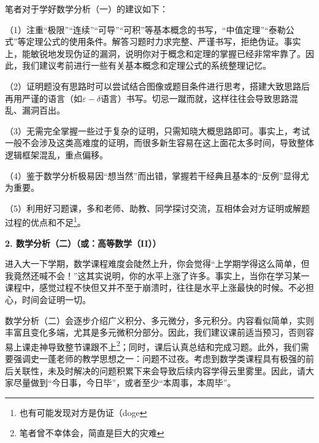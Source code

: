 \documentclass[11pt,oneside]{book}
\begin{document}
\vspace{10pt}

笔者对于学好数学分析（一）的建议如下：

\vspace{10pt}

（1）注重“极限”“连续”“可导”“可积”等基本概念的书写，“中值定理”“泰勒公式”等定理公式的使用条件。解答习题时力求完整、严谨书写，拒绝伪证。事实上，能敏锐地发现伪证的漏洞，说明你对于概念和定理的掌握已经非常牢靠了。因此，我们建议考前进行一些有关基本概念和定理公式的系统整理记忆。

\vspace{10pt}

（2）证明题没有思路时可以尝试结合图像或题目条件进行思考，搭建大致思路后再用严谨的语言（如$\varepsilon-\delta$语言）书写。切忌一蹴而就，这样往往会导致思路混乱、漏洞百出。

\vspace{10pt}

（3）无需完全掌握一些过于复杂的证明，只需知晓大概思路即可。事实上，考试一般不会涉及这类高难度的证明，而很多新生容易在这上面花太多时间，导致整体逻辑框架混乱，重点偏移。

\vspace{10pt}

（4）鉴于数学分析极易因“想当然”而出错，掌握若干经典且基本的“反例”显得尤为重要。

\vspace{10pt}

（5）利用好习题课，多和老师、助教、同学探讨交流，互相体会对方证明或解题过程的优点和不足\footnote{也有可能发现对方是伪证（doge}。

\vspace{10pt}

\textbf{2. 数学分析（二）（或：高等数学（II））}

进入大一下学期，数学课程难度会陡然上升，你会觉得“上学期学得这么简单，但我竟然还喊不会！”这其实说明，你的水平上涨了许多。事实上，当你在学习某一课程中，感觉过程不快但又并不至于崩溃时，往往是水平上涨最快的时候。不必担心，时间会证明一切。

\vspace{10pt}

数学分析（二）会逐步介绍广义积分、多元微分，多元积分。内容看似简单，实则丰富且变化多端，尤其是多元微积分部分。因此，我们建议课前适当预习，否则容易上课走神导致整节课跟不上\footnote{笔者曾不幸体会，简直是巨大的灾难}；同时，课后认真总结和完成习题。此外，我们需要强调史一蓬老师的教学思想之一：问题不过夜。考虑到数学类课程具有极强的前后关联性，未及时解决的问题积累下来会导致后续内容学得云里雾里。因此，请大家尽量做到“今日事，今日毕”，或者至少“本周事，本周毕”。
\end{document}
